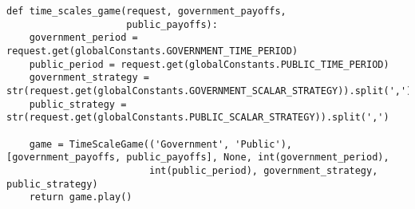 \begin{itemize}
\begin{lstlisting}[style=fsharpstyle]
def time_scales_game(request, government_payoffs,
                     public_payoffs):
    government_period = request.get(globalConstants.GOVERNMENT_TIME_PERIOD)
    public_period = request.get(globalConstants.PUBLIC_TIME_PERIOD)
    government_strategy = str(request.get(globalConstants.GOVERNMENT_SCALAR_STRATEGY)).split(',')
    public_strategy = str(request.get(globalConstants.PUBLIC_SCALAR_STRATEGY)).split(',')

    game = TimeScaleGame(('Government', 'Public'), [government_payoffs, public_payoffs], None, int(government_period),
                         int(public_period), government_strategy, public_strategy)
    return game.play()


 \end{lstlisting}
\end{itemize}